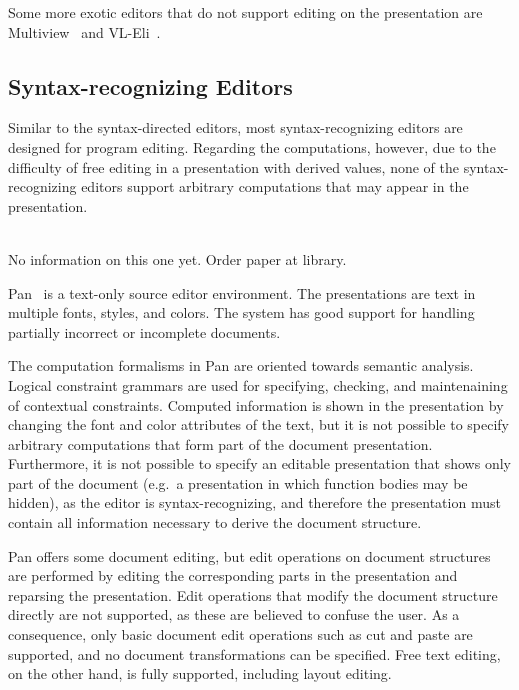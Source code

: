 Some more exotic editors that do not support editing on the presentation are Multiview~\cite{read96multiview} and {VL-Eli}~\cite{kastens02vl-eli}.


%																
\subsection{Syntax-recognizing Editors}

Similar to the syntax-directed editors, most syntax-recognizing editors are designed for program editing. Regarding the computations, however, due to the difficulty of free editing in a presentation with derived values, none of the syntax-recognizing editors support arbitrary computations that may appear in the presentation.

\bc
\toHere     %

\\

No information on this one yet. Order paper at library.

\fromHere  %
\ec


Pan~\cite{ballance92pan} is a text-only source editor environment. The presentations are text in multiple fonts, styles, and colors. The system has good support for handling partially incorrect or incomplete documents.

The computation formalisms in Pan are oriented towards semantic analysis. Logical constraint grammars are used for specifying, checking, and maintenaining of contextual constraints. Computed information is shown in the presentation by changing the font and color attributes of the text, but it is not possible to specify arbitrary computations that form part of the document presentation. Furthermore, it is not possible to specify an editable presentation that shows only part of the document (e.g.\ a presentation in which function bodies may be hidden), as the editor is syntax-recognizing, and therefore the presentation must contain all information necessary to derive the document structure.

Pan offers some document editing, but edit operations on document structures are performed by editing the corresponding parts in the presentation and reparsing the presentation. Edit operations that modify the document structure directly are not supported, as these are believed to confuse the user. As a consequence, only basic document edit operations such as cut and paste are supported, and no document transformations can be specified. Free text editing, on the other hand, is fully supported, including layout editing. 

